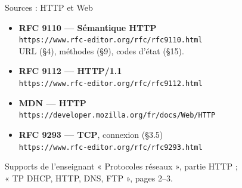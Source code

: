 \documentclass[aspectratio=169,11pt]{beamer}
\begin{document}
\begin{frame}{Sources : HTTP et Web}
  \small
  \setlength{\parskip}{2pt}
  \begin{itemize}
    \item \textbf{RFC 9110 — Sémantique HTTP}\\
      \texttt{https://www.rfc-editor.org/rfc/rfc9110.html}\\
      URL (§4), méthodes (§9), codes d'état (§15).
    \item \textbf{RFC 9112 — HTTP/1.1}\\
      \texttt{https://www.rfc-editor.org/rfc/rfc9112.html}
    \item \textbf{MDN — HTTP}\\
      \texttt{https://developer.mozilla.org/fr/docs/Web/HTTP}
    \item \textbf{RFC 9293 — TCP}, connexion (§3.5)\\
      \texttt{https://www.rfc-editor.org/rfc/rfc9293.html}
  \end{itemize}
  \begin{block}{Supports de l'enseignant}
    « Protocoles réseaux », partie HTTP ;\\
    « TP DHCP, HTTP, DNS, FTP », pages 2--3.
  \end{block}
\end{frame}
\end{document}
